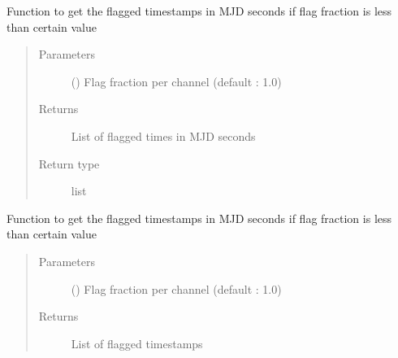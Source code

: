 \documentclass[letterpaper,10pt,english]{sphinxmanual}
\begin{document}
\begin{fulllineitems}

\begin{fulllineitems}
\label{\detokenize{paircars:paircars.access_ms.AccessMS.get_flag_times_mjd}}
\sphinxAtStartPar
Function to get the flagged timestamps in MJD seconds if flag fraction is less than certain value
\begin{quote}\begin{description}
\item[{Parameters}] \leavevmode
\sphinxAtStartPar
{} () \textendash{} Flag fraction per channel (default : 1.0)

\item[{Returns}] \leavevmode
\sphinxAtStartPar
List of flagged times in MJD seconds

\item[{Return type}] \leavevmode
\sphinxAtStartPar
list

\end{description}\end{quote}

\end{fulllineitems}


\begin{fulllineitems}
\label{\detokenize{paircars:paircars.access_ms.AccessMS.get_flag_timestamps}}
\sphinxAtStartPar
Function to get the flagged timestamps in MJD seconds if flag fraction is less than certain value
\begin{quote}\begin{description}
\item[{Parameters}] \leavevmode
\sphinxAtStartPar
{} () \textendash{} Flag fraction per channel (default : 1.0)

\item[{Returns}] \leavevmode
\sphinxAtStartPar
List of flagged timestamps


\end{description}
\end{quote}
\end{fulllineitems}
\end{fulllineitems}
\end{document}
